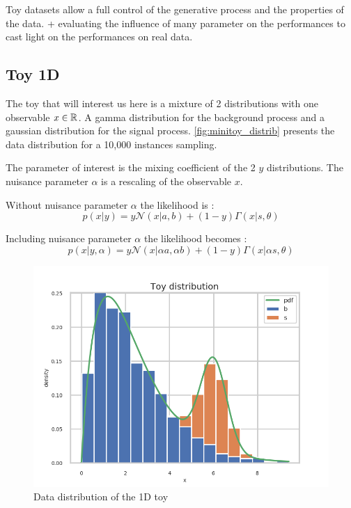 Toy datasets allow a full control of the generative process and the properties of the data.
+ evaluating the influence of many parameter on the performances to cast light on the performances on real data.






\subsection{Toy 1D} %
\label{sub:toy_1d}

The toy that will interest us here is a mixture of 2 distributions with one observable $x \in \mathbb{R}$.
A gamma distribution for the background process and a gaussian distribution for the signal process.
\autoref{fig:minitoy_distrib} presents the data distribution for a 10,000 instances sampling.

The parameter of interest is the mixing coefficient of the 2 $y$ distributions.
The nuisance parameter $\alpha$ is a rescaling of the observable $x$.

Without nuisance parameter $\alpha$ the likelihood is :
$$
    p(x | y) = y \mathcal N(x|a, b) + (1-y) \Gamma(x|s, \theta)
$$

Including nuisance parameter $\alpha$ the likelihood becomes :
$$
    p(x | y, \alpha) = y \mathcal N(x|\alpha a, \alpha b) + (1-y) \Gamma(x|\alpha s, \theta)
$$

\begin{figure}[htb]
    \includegraphics[width=\linewidth]{minitoy/distrib.png}
    \caption{Data distribution of the 1D toy}
    \label{fig:minitoy_distrib}
\end{figure}






